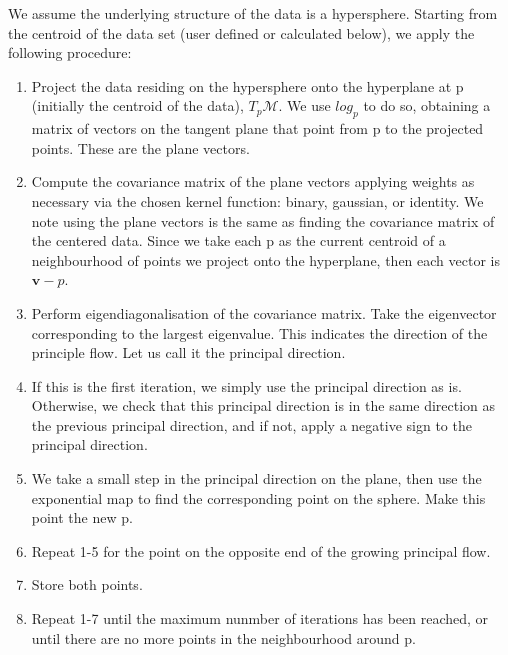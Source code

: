 \documentclass[12pt]{report}
\begin{document}
We assume the underlying structure of the data is a hypersphere.
Starting from the centroid of the data set (user defined or calculated below), 
we apply the following procedure: 
\begin{enumerate}
    \item Project the data residing on the hypersphere onto the hyperplane
    at p (initially the centroid of the data), $T_p\mathcal{M}$. We use $log_p$ to do so, 
    obtaining a matrix of vectors on the tangent plane that point from p
    to the projected points. These are the plane vectors.

    \item Compute the covariance matrix of the plane vectors
    applying weights as necessary via the chosen kernel function:
    binary, gaussian, or identity. We note using the plane vectors
    is the same as finding the covariance matrix of the centered data.
    Since we take each p as the current centroid of a neighbourhood of
    points we project onto the hyperplane, then each vector is $\mathbf{v}-p$.

    \item Perform eigendiagonalisation of the covariance matrix. 
    Take the eigenvector corresponding to the largest eigenvalue. 
    This indicates the direction of the principle flow. Let us call it
    the principal direction.

    \item If this is the first iteration, we simply use the principal direction
    as is. Otherwise, we check that this principal direction is in the same 
    direction as the previous principal direction, and if not, apply a negative sign
    to the principal direction.

    \item We take a small step in the principal direction on the plane,
    then use the exponential map to find the corresponding point on the sphere.
    Make this point the new p.

    \item Repeat 1-5 for the point on the opposite end of the growing principal flow.

    \item Store both points. 
    
    \item Repeat 1-7 until the maximum nunmber of iterations has been reached,
    or until there are no more points in the neighbourhood around p.
\end{enumerate}
\end{document}
